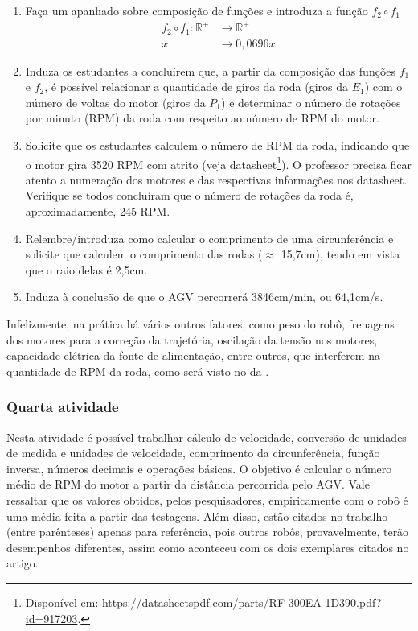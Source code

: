 \documentclass{textolivre-html}
\begin{document}
\begin{enumerate}
\item\label{itm1sec423} Faça um apanhado sobre composição de funções e introduza a função $f_2 \circ f_1$
    \begin{align*}
    f_2 \circ f_1: \mathbb{R}^{+} &\rightarrow \mathbb{R}^{+}  \\
    x &\rightarrow 0,0696x \nonumber
    \end{align*}

\item Induza os estudantes a concluírem que, a partir da composição das funções
$f_1$ e $f_2$, é possível relacionar a quantidade de giros da roda (giros da
$E_1$) com o número de voltas do motor (giros da $P_1$) e determinar o número
de rotações por minuto (RPM) da roda com respeito ao número de RPM do motor.

\item Solicite que os estudantes calculem o número de RPM da roda, indicando
que o motor gira 3520 RPM com atrito (veja datasheet\footnote{Disponível em:
\url{https://datasheetspdf.com/parts/RF-300EA-1D390.pdf?id=917203}.}). O
professor precisa ficar atento a numeração dos motores e das respectivas
informações nos datasheet. Verifique se todos concluíram que o número de
rotações da roda é, aproximadamente, 245 RPM.

\item Relembre/introduza como calcular o comprimento de uma circunferência e
solicite que calculem o comprimento das rodas ($\approx$ 15,7cm), tendo em
vista que o raio delas é 2,5cm.

\item Induza à conclusão de que o AGV percorrerá 3846cm/min, ou 64,1cm/s.
\end{enumerate}

Infelizmente, na prática há vários outros fatores, como peso do robô, frenagens
dos motores para a correção da trajetória, oscilação da tensão nos motores,
capacidade elétrica da fonte de alimentação, entre outros, que interferem na
quantidade de RPM da roda, como será visto no  da .

\subsubsection{Quarta atividade}\label{sec-quarta}
Nesta atividade é possível trabalhar cálculo de velocidade, conversão de
unidades de medida e unidades de velocidade, comprimento da circunferência,
função inversa, números decimais e operações básicas. O objetivo é calcular o
número médio de RPM do motor a partir da distância percorrida pelo AGV. Vale
ressaltar que os valores obtidos, pelos pesquisadores, empiricamente com o robô
é uma média feita a partir das testagens. Além disso, estão citados no trabalho
(entre parênteses) apenas para referência, pois outros robôs, provavelmente,
terão desempenhos diferentes, assim como aconteceu com os dois exemplares
citados no artigo.
\end{document}
